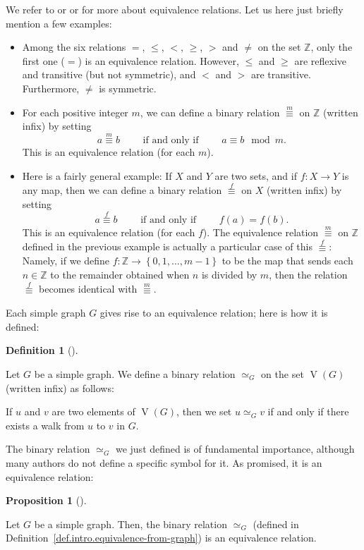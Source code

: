 \documentclass[numbers=enddot,12pt,final,onecolumn,notitlepage]{scrartcl}%
\theoremstyle{definition}
\newtheorem{prop}[theo]{Proposition}
\newenvironment{proposition}[1][]
{\begin{prop}[#1]\begin{leftbar}}
{\end{leftbar}\end{prop}}
\newtheorem{defi}[theo]{Definition}
\newenvironment{definition}[1][]
{\begin{defi}[#1]\begin{leftbar}}
{\end{leftbar}\end{defi}}
\newcommand{\ZZ}{\mathbb{Z}}
\newcommand{\set}[1]{\left\{ #1 \right\}}
\newcommand{\tup}[1]{\left( #1 \right)}
\newcommand{\verts}[1]{\operatorname{V}\left( #1 \right)}
\begin{document}
We refer to \cite[\S 10.10]{LeLeMe16} or \cite[Chapter 9]{Oggier14}
or \cite[\S 3.E]{Day-proofs}
for more about equivalence relations. Let us here just briefly
mention a few examples:
\begin{itemize}
\item Among the six relations $=$, $\leq$, $<$, $\geq$, $>$ and $\neq$
on the set $\ZZ$, only the first one ($=$) is an equivalence relation.
However, $\leq$ and $\geq$ are reflexive and transitive (but not
symmetric), and $<$ and $>$ are transitive. Furthermore, $\neq$ is
symmetric.
\item For each positive integer $m$, we can define a binary relation
$\overset{m}{\equiv}$ on $\ZZ$ (written infix) by setting
\[
a \overset{m}{\equiv} b
\qquad \text{ if and only if } \qquad
a \equiv b \mod m .
\]
This is an equivalence relation (for each $m$).
\item Here is a fairly general example: If $X$ and $Y$ are two sets,
and if $f : X \to Y$ is any map, then we can define a binary relation
$\overset{f}{\equiv}$ on $X$ (written infix) by setting
\[
a \overset{f}{\equiv} b
\qquad \text{ if and only if } \qquad
f \tup{a} = f \tup{b} .
\]
This is an equivalence relation (for each $f$). The equivalence
relation $\overset{m}{\equiv}$ on $\ZZ$ defined in the previous
example is actually a particular case of this $\overset{f}{\equiv}$:
Namely, if we define $f : \ZZ \to \set{0, 1, \ldots, m-1}$ to be the
map that sends each $n \in \ZZ$ to the remainder obtained when $n$ is
divided by $m$, then the relation $\overset{f}{\equiv}$ becomes
identical with $\overset{m}{\equiv}$.
\end{itemize}

Each simple graph $G$ gives rise to an equivalence relation; here is
how it is defined:

\begin{definition} \label{def.intro.equivalence-from-graph}
Let $G$ be a simple graph. We define a binary relation $\simeq_G$ on
the set $\verts{G}$ (written infix) as follows:

If $u$ and $v$ are two elements of $\verts{G}$, then we set
$u \simeq_G v$ if and only if there exists a walk from $u$ to $v$ in
$G$.
\end{definition}

The binary relation $\simeq_G$ we just defined is of fundamental
importance, although many authors do not define a specific symbol for
it. As promised, it is an equivalence relation:

\begin{proposition} \label{prop.intro.equivalence-from-graph.equiv}
Let $G$ be a simple graph. Then, the binary relation $\simeq_G$
(defined in Definition~\ref{def.intro.equivalence-from-graph}) is an
equivalence relation.
\end{proposition}
\end{document}
